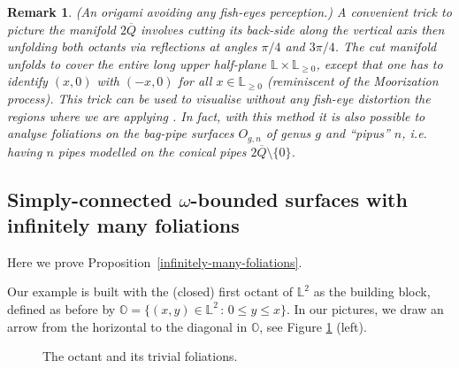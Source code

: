 \documentclass{amsart}
\newtheorem{rem}[theorem]{Remark}
\begin{document}
\begin{rem} {\it (An origami avoiding any fish-eyes perception.)} {\rm A convenient trick to picture the manifold $2\overline{Q}$ involves cutting its back-side along the vertical axis then unfolding both octants via reflections at angles $\pi/4$ and $3\pi/4$. The cut manifold unfolds to cover the entire long upper half-plane ${\mathbb L} \times {\mathbb L}_{\ge 0}$, except that one has to identify $(x,0)$ with $(-x,0)$ for all $x\in{\mathbb L}_{\ge 0}$ (reminiscent of the Moorization process). This trick can be used to visualise without any fish-eye distortion the regions where we are applying \cite[Lemma~6.4]{BGG}. In fact, with this method it is also possible to analyse foliations on the bag-pipe surfaces $O_{g,n}$ of genus $g$ and ``pipus'' $n$, i.e. having $n$ pipes modelled on the conical pipes $2\overline{Q}\setminus\{ 0\}$.}

\end{rem}

\subsection{Simply-connected $\omega$-bounded surfaces with infinitely many foliations}\label{pipus-zero}

Here we prove Proposition~\ref{infinitely-many-foliations}.

Our example is built with the (closed) first octant of ${\mathbb{L}}^2$ as the building block, defined as before by $ {\mathbb{O}}=\{(x,y)\in{\mathbb{L}}^2\,:\,0\le y\le x\}$. In our pictures, we draw an arrow from the horizontal to the diagonal in ${\mathbb{O}}$, see Figure \ref{infa} (left).

\begin{figure}[h]
\centering
    \caption{\label{infa} The octant and its trivial foliations.}
\end{figure}
\end{document}
